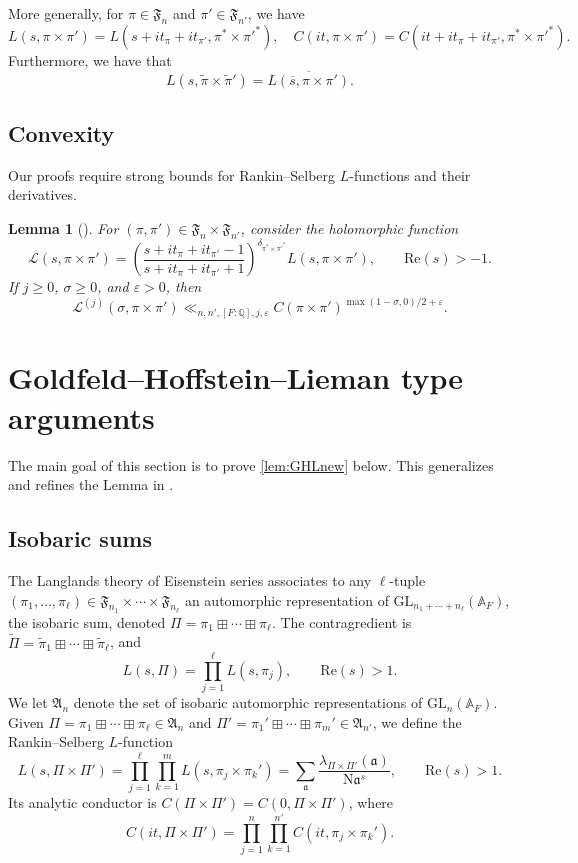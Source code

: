 \documentclass[12pt]{amsart}
\newtheorem{lemma}[theorem]{Lemma}
\theoremstyle{definition}
\theoremstyle{remark}
\numberwithin{equation}{section}
\theoremstyle{plain}
\renewcommand{\tilde}{\widetilde}
\renewcommand{\bar}{\overline}
\renewcommand{\epsilon}{\varepsilon}
\renewcommand{\Re}{\mathrm{Re}}
\newcommand{\GL}{\mathrm{GL}}
\newcommand{\N}{\mathrm{N}}
\newcommand{\A}{\mathbb{A}}
\newcommand{\Q}{\mathbb{Q}}
\newcommand{\ka}{\mathfrak{a}}
\newcommand{\cL}{\mathcal{L}}
\begin{document}
More generally, for $\pi\in\mathfrak{F}_{n}$ and $\pi'\in\mathfrak{F}_{n'}$, we have
\[
L(s,\pi\times\pi') = L(s+it_{\pi}+it_{\pi'},\pi^*\times\pi'^*),\quad 
C(it,\pi\times\pi')=C(it+it_{\pi}+it_{\pi'},\pi^*\times\pi'^*).
\]
Furthermore, we have that
\begin{equation}
\label{eqn:conjugate_symmetry}
L(s,\tilde{\pi}\times\tilde{\pi}') = \overline{L(\bar{s},\pi\times\pi')}.
\end{equation}

\subsection{Convexity}

Our proofs require strong bounds for Rankin--Selberg $L$-functions and their derivatives. 

\begin{lemma}[{\cite[Lemma~3.2]{HarcosThorner}}]
\label{lem:Li1}
For $(\pi,\pi')\in\mathfrak{F}_n\times\mathfrak{F}_{n'}$, consider the holomorphic function
\[
\cL(s,\pi\times\pi')=\left(\frac{s+it_{\pi}+it_{\pi'}-1}{s+it_{\pi}+it_{\pi'}+1}\right)^{\delta_{\pi^*\times\pi'^*}}L(s,\pi\times\pi'),\qquad\Re(s)>-1.
\]
If $j\geq 0$, $\sigma\geq 0$, and $\epsilon>0$, then
\[
\cL^{(j)}(\sigma,\pi\times\pi')\ll_{n,n',[F:\Q],j,\epsilon}C(\pi\times\pi')^{\max(1-\sigma,0)/2+\epsilon}.
\]
\end{lemma}

\section{Goldfeld--Hoffstein--Lieman type arguments}

The main goal of this section is to prove \cref{lem:GHLnew} below.  This generalizes and refines the Lemma in \cite[Appendix]{HoffsteinLockhart}.

\subsection{Isobaric sums}

The Langlands theory of Eisenstein series associates to any $\ell$-tuple 
$(\pi_1,\dotsc,\pi_\ell)\in\mathfrak{F}_{n_1}\times\dotsb\times \mathfrak{F}_{n_\ell}$ an automorphic representation of $\GL_{n_1+\dotsb+n_\ell}(\A_F)$, the isobaric sum, denoted $\Pi=\pi_1\boxplus\dotsb\boxplus\pi_\ell$. The contragredient is $\tilde{\Pi}=\tilde{\pi}_1\boxplus\dotsb\boxplus\tilde{\pi}_\ell$, and
\[
L(s,\Pi)=\prod_{j=1}^\ell L(s,\pi_j),\qquad \Re(s)>1.
\]
We let $\mathfrak{A}_n$ denote the set of isobaric automorphic representations of $\GL_{n}(\A_F)$.  Given $\Pi=\pi_1\boxplus\dotsb\boxplus\pi_\ell\in\mathfrak{A}_n$ and $\Pi'=\pi_1'\boxplus\dotsb\boxplus\pi_m'\in\mathfrak{A}_{n'}$, we define the Rankin--Selberg $L$-function
\[
L(s,\Pi\times\Pi')=\prod_{j=1}^\ell \prod_{k=1}^m L(s,\pi_j\times\pi_k')=\sum_{\ka}\frac{\lambda_{\Pi\times\Pi'}(\ka)}{\N\ka^s},\qquad \Re(s)>1.
\]
Its analytic conductor is $C(\Pi\times\Pi')=C(0,\Pi\times\Pi')$, where
\[
C(it,\Pi\times\Pi') = \prod_{j=1}^n \prod_{k=1}^{n'}C(it,\pi_j\times\pi_{k}').
\]
\end{document}
